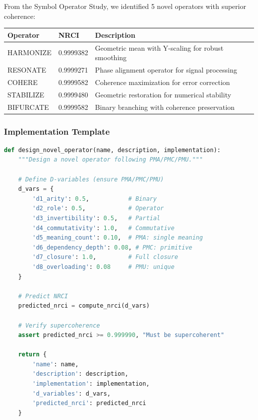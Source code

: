 From the Symbol Operator Study, we identified 5 novel operators with superior coherence:

\begin{table}[h]
\centering
\small
\begin{tabular}{llp{6cm}}
\toprule
\textbf{Operator} & \textbf{NRCI} & \textbf{Description} \\
\midrule
HARMONIZE & 0.9999382 & Geometric mean with Y-scaling for robust smoothing \\
RESONATE & 0.9999271 & Phase alignment operator for signal processing \\
COHERE & 0.9999582 & Coherence maximization for error correction \\
STABILIZE & 0.9999480 & Geometric restoration for numerical stability \\
BIFURCATE & 0.9999582 & Binary branching with coherence preservation \\
\bottomrule
\end{tabular}
\end{table}

\subsubsection{Implementation Template}

\begin{lstlisting}[language=Python, caption=Novel Operator Template]
def design_novel_operator(name, description, implementation):
    """Design a novel operator following PMA/PMC/PMU."""
    
    # Define D-variables (ensure PMA/PMC/PMU)
    d_vars = {
        'd1_arity': 0.5,           # Binary
        'd2_role': 0.5,            # Operator
        'd3_invertibility': 0.5,   # Partial
        'd4_commutativity': 1.0,   # Commutative
        'd5_meaning_count': 0.10,  # PMA: single meaning
        'd6_dependency_depth': 0.08, # PMC: primitive
        'd7_closure': 1.0,         # Full closure
        'd8_overloading': 0.08     # PMU: unique
    }
    
    # Predict NRCI
    predicted_nrci = compute_nrci(d_vars)
    
    # Verify supercoherence
    assert predicted_nrci >= 0.999990, "Must be supercoherent"
    
    return {
        'name': name,
        'description': description,
        'implementation': implementation,
        'd_variables': d_vars,
        'predicted_nrci': predicted_nrci
    }
\end{lstlisting}

